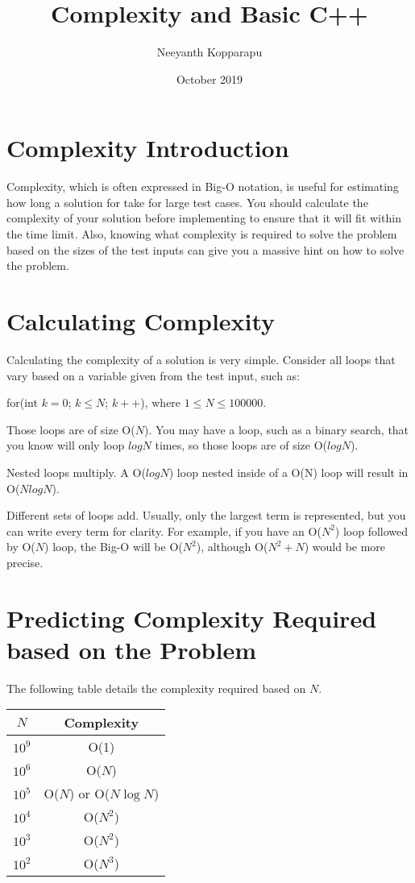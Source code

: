 \documentclass{article}
\title{Complexity and Basic C++}
\author{Neeyanth Kopparapu}
\date{October 2019}
\begin{document}
\maketitle

\section{Complexity Introduction}
Complexity, which is often expressed in Big-O notation, is useful for estimating how long a solution for take for large test cases. You should calculate the complexity of your solution before implementing to ensure that it will fit within the time limit. Also, knowing what complexity is required to solve the problem based on the sizes of the test inputs can give you a massive hint on how to solve the problem.

\section{Calculating Complexity}
Calculating the complexity of a solution is very simple. Consider all loops that vary based on a variable given from the test input, such as:

for(int $k = 0$; $k \leq N$; $k++$), where $1\leq N \leq 100000.$

Those loops are of size O($N$). You may have a loop, such as a binary search, that you know will only loop $logN$ times, so those loops are of size O($logN$).

Nested loops multiply. A O($logN$) loop nested inside of a O(N) loop will result in O($NlogN$).

Different sets of loops add. Usually, only the largest term is represented, but you can write every term for clarity. For example, if you have an O($N^{2}$) loop followed by O($N$) loop, the Big-O will be O($N^{2}$), although O($N^{2} + N$) would be more precise.

\section{Predicting Complexity Required based on the Problem}
The following table details the complexity required based on $N.$

\begin{center}
    \begin{tabular}{||c|c||}
    \hline
       $N$  &  Complexity\\
      \hline\hline
        $10^9$ & O(1) \\
        \hline
        $10^6$ & O($N$) \\
        \hline
        $10^5$ & O($N$) or O($N\log{N}$)\\
        \hline
        $10^4$ & O($N^2$) \\
        \hline
        $10^3$ & O($N^2$) \\
        \hline
        $10^2$ & O($N^3$) \\
        \hline
    \end{tabular}
\end{center}
\end{document}

